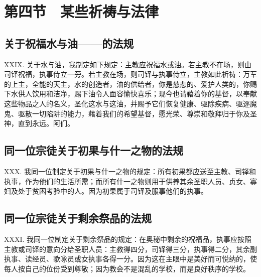
\section{第四节　某些祈祷与法律}


\subsection{关于祝福水与油——的法规}

XXIX. 关于水与油，我制定如下规定：主教应祝福水或油。若主教不在场，则由司铎祝福，执事侍立一旁。若主教在场，则司铎与执事侍立，主教如此祈祷：万军的上主，全能的天主，水的创造者，油的供给者，你是慈悲的、爱护人类的，你赐下水供人饮用和洁净，赐下油令人面容愉快喜乐；现今也请藉着你的基督，以奉献这些物品之人的名义，圣化这水与这油，并赐予它们恢复健康、驱除疾病、驱逐魔鬼、驱散一切陷阱的能力，藉着我们的希望基督，愿光荣、尊崇和敬拜归于你及圣神，直到永远。阿们。\par


\subsection{同一位宗徒关于初果与什一之物的法规}

XXX. 我同一位制定关于初果与什一之物的规定：所有初果都应送至主教、司铎和执事，作为他们的生活所需；而所有什一之物则用于供养其余圣职人员、贞女、寡妇及处于贫困考验中的人。因为初果属于司铎及服事他们的执事。\par


\subsection{同一位宗徒关于剩余祭品的法规}

XXXI. 我同一位制定关于剩余祭品的规定：在奥秘中剩余的祝福品，执事应按照主教或司铎的意向分给圣职人员：主教得四分，司铎得三分，执事得二分，其余副执事、读经员、歌咏员或女执事各得一分。因为这在主眼中是美好而可悦纳的，使每人按自己的位份受到尊敬；因为教会不是混乱的学校，而是良好秩序的学校。\par

